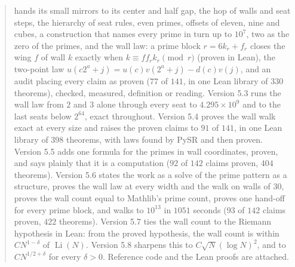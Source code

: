 \documentclass[11pt]{article}
\begin{document}
\begin{abstract}
hands its small mirrors to its center and half gap, the hop of walls and seat steps, the hierarchy of seat rules, even primes, offsets of eleven, nine and cubes, a construction that names every prime in turn up to $10^7$, two as the zero of the primes, and the wall law: a prime block $r = 6k_r+f_r$ closes the wing $f$ of wall $k$ exactly when $k\equiv f f_r k_r \pmod r$ (proven in Lean), the two-point law $u(c2^a+j) = u(c)v(2^a+j) - d(c)v(j)$, and an audit placing every claim as proven ($77$ of $141$, in one Lean library of $330$ theorems), checked, measured, definition or reading. Version 5.3 runs the wall law from $2$ and $3$ alone through every seat to $4.295\times10^9$ and to the last seats below $2^{64}$, exact throughout. Version 5.4 proves the wall walk exact at every size and raises the proven claims to $91$ of $141$, in one Lean library of $398$ theorems, with laws found by PySR and then proven. Version 5.5 adds one formula for the primes in wall coordinates, proven, and says plainly that it is a computation ($92$ of $142$ claims proven, $404$ theorems). Version 5.6 states the work as a solve of the prime pattern as a structure, proves the wall law at every width and the walk on walls of $30$, proves the wall count equal to Mathlib's prime count, proves one hand-off for every prime block, and walks to $10^{13}$ in $1051$ seconds ($93$ of $142$ claims proven, $422$ theorems). Version 5.7 ties the wall count to the Riemann hypothesis in Lean: from the proved hypothesis, the wall count is within $C N^{1-\delta}$ of $\operatorname{Li}(N)$. Version 5.8 sharpens this to $C\sqrt{N}(\log N)^2$, and to $C N^{1/2+\delta}$ for every $\delta>0$. Reference code and the Lean proofs are attached.
\end{abstract}
\end{document}
